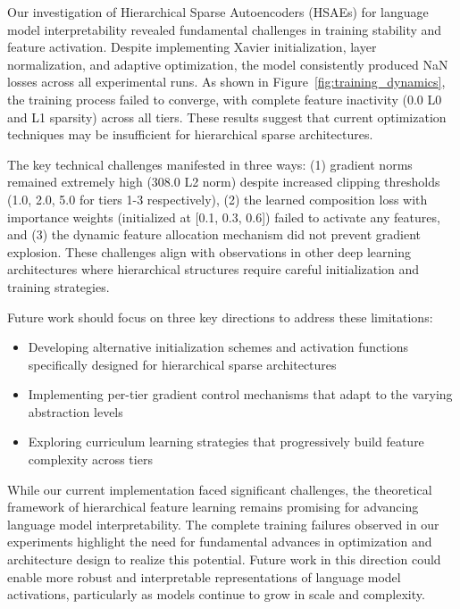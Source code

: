 \documentclass{article} %
\begin{document}
Our investigation of Hierarchical Sparse Autoencoders (HSAEs) for language model interpretability revealed fundamental challenges in training stability and feature activation. Despite implementing Xavier initialization, layer normalization, and adaptive optimization, the model consistently produced NaN losses across all experimental runs. As shown in Figure~\ref{fig:training_dynamics}, the training process failed to converge, with complete feature inactivity (0.0 L0 and L1 sparsity) across all tiers. These results suggest that current optimization techniques may be insufficient for hierarchical sparse architectures.

The key technical challenges manifested in three ways: (1) gradient norms remained extremely high (308.0 L2 norm) despite increased clipping thresholds (1.0, 2.0, 5.0 for tiers 1-3 respectively), (2) the learned composition loss with importance weights (initialized at [0.1, 0.3, 0.6]) failed to activate any features, and (3) the dynamic feature allocation mechanism did not prevent gradient explosion. These challenges align with observations in other deep learning architectures where hierarchical structures require careful initialization and training strategies.

Future work should focus on three key directions to address these limitations:
\begin{itemize}
    \item Developing alternative initialization schemes and activation functions specifically designed for hierarchical sparse architectures
    \item Implementing per-tier gradient control mechanisms that adapt to the varying abstraction levels
    \item Exploring curriculum learning strategies that progressively build feature complexity across tiers
\end{itemize}

While our current implementation faced significant challenges, the theoretical framework of hierarchical feature learning remains promising for advancing language model interpretability. The complete training failures observed in our experiments highlight the need for fundamental advances in optimization and architecture design to realize this potential. Future work in this direction could enable more robust and interpretable representations of language model activations, particularly as models continue to grow in scale and complexity.



\end{document}
